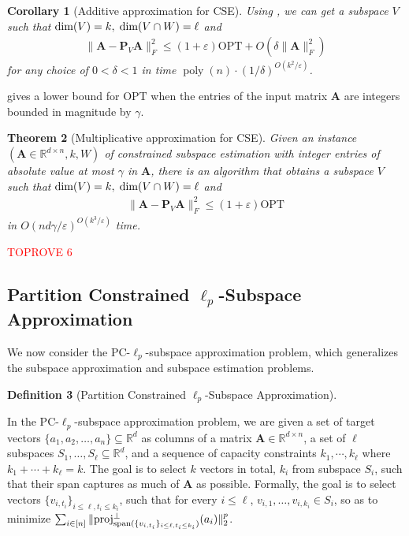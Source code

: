 \documentclass[11pt]{article}
\makeatletter
\theoremstyle{plain}
\newtheorem{theorem}{Theorem}[section]
\newtheorem{cor}[theorem]{Corollary}
\theoremstyle{plain}
\theoremstyle{definition}
\newtheorem{defn}[theorem]{Definition}
\theoremstyle{plain}
\theoremstyle{remark}
\newenvironment{proof}[1][\protect\proofname]{\par
	\normalfont\topsep6\p@\@plus6\p@\relax
	\trivlist
	\itemindent\parindent
	\item[\hskip\labelsep\scshape #1]\ignorespaces
}{\endtrivlist\@endpefalse
}
\providecommand{\proofname}{Proof}
\newcommand{\RR}{\mathbb{R}}
\newcommand{\poly}{\operatorname{poly}}
\newcommand{\opt}{\ensuremath{\text{OPT}}\xspace}
\DeclareRobustCommand{\fairSAp}[1]{PC-$\ell_{#1}$-subspace approximation}
\DeclareRobustCommand{\proj}{\mbox{proj}}
\makeatother
\begin{document}
\begin{cor}[Additive approximation for CSE]\label{cor:CSE-additive}
    Using , we can get a subspace $V$ such that $\textnormal{dim}(V)=k,\; \textnormal{dim}(V \cap W)= \ell$ and 
    \begin{align*}
       \|\bm{A}-\bm{P}_V\bm{A}\|_F^2 \leq (1+\varepsilon)\opt + O(\delta \|\bm{A}\|_F^2)
   \end{align*}
    for any choice of $0<\delta<1$ in time $\poly(n)\cdot (1/\delta)^{O(k^2/\varepsilon)}$.  
\end{cor}



 gives a lower bound for $\opt$ when the entries of the input matrix $\bm{A}$ are integers bounded in magnitude by $\gamma$.


\begin{theorem}[Multiplicative approximation for CSE]\label{thm:CSE-multiplicative}
    Given an instance $(\bm{A}\in \RR^{d\times n}, k, W)$ of constrained subspace estimation with integer entries of absolute value at most $\gamma$ in $\bm{A}$, there is an algorithm that obtains a subspace $V$ such that $\textnormal{dim}(V)=k,\; \textnormal{dim}(V \cap W)= \ell$ and 
    \begin{align*}
        \|\bm{A}-\bm{P}_V\bm{A}\|_F^2 \leq (1+\varepsilon)\opt
    \end{align*}
 in $ O(nd\gamma/\varepsilon)^{O(k^3/\varepsilon)}$ time. 
\end{theorem}
\begin{proof}\textcolor{red}{TOPROVE 6}\end{proof}


\subsection{Partition Constrained $\ell_p$-Subspace Approximation}\label{sec:subspace-approximation-main}
We now consider the \fairSAp{p} problem, which generalizes the subspace approximation and subspace estimation problems. 

\begin{defn}[Partition Constrained $\ell_p$-Subspace Approximation]\label{def:constrained-subspace-selection}

In the \fairSAp{p} problem, we are given a set of target vectors $\{a_1,a_2,\dots,a_n\}\subseteq \RR^d$ as columns of a matrix $\bm{A}\in \RR^{d\times n}$, a set of $\ell$ subspaces $S_1,\dots,S_\ell \subseteq \RR^d$, and a sequence of capacity constraints $k_1, \cdots, k_\ell$ where $k_1 + \cdots + k_\ell = k$. The goal is to select $k$ vectors in total, $k_i$ from subspace $S_i$, such that their span captures as much of $\bm{A}$ as possible. Formally, the goal is to select vectors $\{v_{i,t_i}\}_{i\le \ell, t_i\le k_i}$, such that for every $i\le \ell$, $v_{i,1},\dots, v_{i,k_i} \in S_i$, so as to minimize $ \sum_{i\in [n]}\|\proj^{\bot}_{\textnormal{span}(\{v_{i,t_i}\}_{i\le \ell, t_i\le k_i})}(a_i)\|_2^p $.  
\end{defn}
\end{document}
